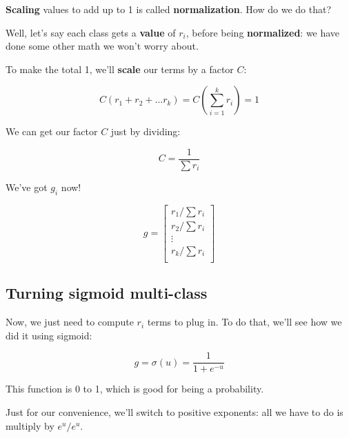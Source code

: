         \textbf{Scaling} values to add up to 1 is called \textbf{normalization}. How do we do that?
        
        Well, let's say each class gets a \textbf{value} of $r_i$, before being \textbf{normalized}: we have done some other math we won't worry about.
        
        To make the total 1, we'll \textbf{scale} our terms by a factor $C$:
        
        \begin{equation}
            C(r_1+r_2+...r_k) 
            = 
            C \left(\sum_{i=1}^k r_i \right)
            =
            1  
        \end{equation}
        
        We can get our factor $C$ just by dividing:
        
        \begin{equation}
            C 
            =
            \frac{1}{\sum r_i}
        \end{equation}
        
        We've got $g_i$ now!
        
        \begin{equation}
            g = 
            \begin{bmatrix}
                r_1/\sum r_i  \\
                r_2/\sum r_i  \\
                \vdots  \\
                r_k/\sum r_i  \\
            \end{bmatrix}
        \end{equation}
        
    \subsection{Turning sigmoid multi-class}
    
        Now, we just need to compute $r_i$ terms to plug in. To do that, we'll see how we did it using sigmoid:
        
        \begin{equation}
            g= \sigma(u) = \frac{1}{1+e^{-u}}
        \end{equation}
        
        This function is 0 to 1, which is good for being a probability. 
        
        Just for our convenience, we'll switch to positive exponents: all we have to do is multiply by $e^u/e^u$.
        
